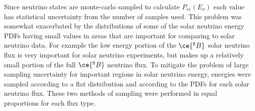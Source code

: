 Since neutrino states are monte-carlo sampled to calculate $P_{ee}(E_{\nu})$
each value has statistical uncertainty from the number of samples used.
This problem was somewhat exacerbated by the distributions of some of the
solar neutrino energy PDFs having small values in areas that are important for
comparing to solar neutrino data. For example the low energy portion of the
$\ce{^{8}B}$ solar neutrino flux is very important for solar neutrino experiments,
but makes up a relatively small portion of the full $\ce{^{8}B}$ neutrino flux.
To mitigate the problem of large sampling uncertainty for important regions in
solar neutrino energy, energies were sampled according to a flat distribution
and according to the PDFs for each solar neutrino flux. These two methods of sampling
were performed in equal proportions for each flux type.

